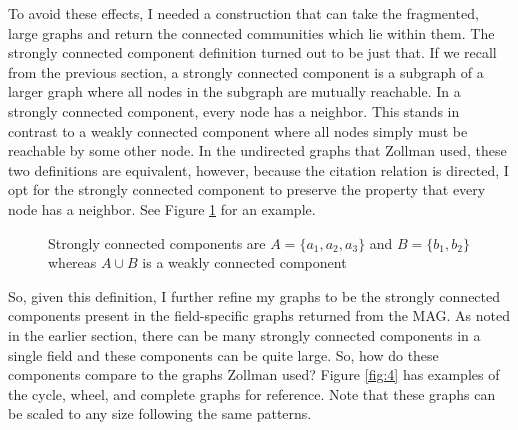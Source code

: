 To avoid these effects, I needed a construction that can take the
fragmented, large graphs and return the connected communities which lie
within them. The strongly connected component definition turned out to
be just that. If we recall from the previous section, a strongly
connected component is a subgraph of a larger graph where all nodes in
the subgraph are mutually reachable. In a strongly connected component,
every node has a neighbor. This stands in contrast to a weakly connected
component where all nodes simply must be reachable by some other node.
In the undirected graphs that Zollman used, these two definitions are
equivalent, however, because the citation relation is directed, I opt
for the strongly connected component to preserve the property that every
node has a neighbor. See Figure \ref{fig:3} for an example.

\begin{figure}
    \centering
    \caption{Strongly connected components are $A = \{ a_1, a_2, a_3 \}$ and $B = \{ b_1, b_2 \}$ whereas $A \cup B$ is a weakly connected component}
    \label{fig:3}
\end{figure}

So, given this definition, I further refine my graphs to be the strongly
connected components present in the field-specific graphs returned from
the MAG. As noted in the earlier section, there can be many strongly
connected components in a single field and these components can be quite
large. So, how do these components compare to the graphs Zollman used?
Figure \ref{fig:4} has examples of the cycle, wheel, and complete graphs
for reference. Note that these graphs can be scaled to any size
following the same patterns.

